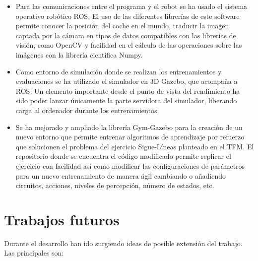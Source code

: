 \begin{itemize}
    \item Para las comunicaciones entre el programa y el robot se ha usado el sistema operativo robótico ROS. El uso de las diferentes librerías de este software permite conocer la posición del coche en el mundo, traducir la imagen captada por la cámara en tipos de datos compatibles con las librerías de visión, como OpenCV y facilidad en el cálculo de las operaciones sobre las imágenes con la librería científica Numpy.\\
    
    \item Como entorno de simulación donde se realizan los entrenamientos y evaluaciones se ha utilizado el simulador en 3D Gazebo, que acompaña a ROS. Un elemento importante desde el punto de vista del rendimiento ha sido poder lanzar únicamente la parte servidora del simulador, liberando carga al ordenador durante los entrenamientos.\\
    
    \item Se ha mejorado y ampliado la librería Gym-Gazebo para la creación de un nuevo entorno que permite entrenar algoritmos de aprendizaje por refuerzo que solucionen el problema del ejercicio Sigue-Líneas planteado en el TFM. El repositorio donde se encuentra el código modificado permite replicar el ejercicio con facilidad así como modificar las configuraciones de parámetros para un nuevo entrenamiento de manera ágil cambiando o añadiendo circuitos, acciones, niveles de percepción, número de estados, etc.\\
\end{itemize}

\section{Trabajos futuros}

Durante el desarrollo han ido surgiendo ideas de posible extensión del trabajo. Las principales son:\\

